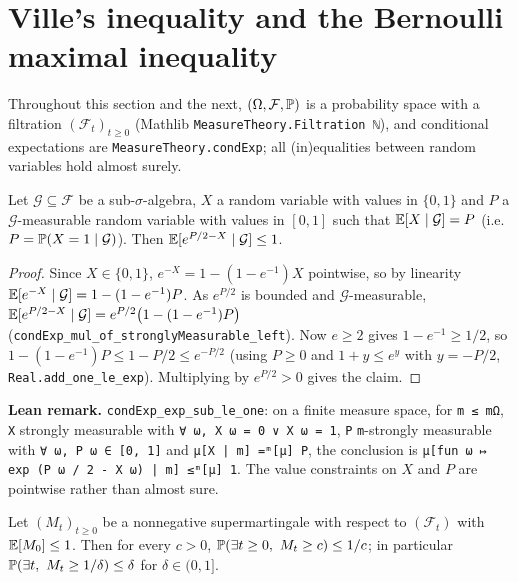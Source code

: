 \section{Ville's inequality and the Bernoulli maximal inequality}
\label{sec:pconc_ville}

Throughout this section and the next, $(\Omega, \mathcal F, \mathbb{P})$ is a probability space
with a filtration $(\mathcal F_t)_{t \ge 0}$ (Mathlib \texttt{MeasureTheory.Filtration ℕ}),
and conditional expectations are \texttt{MeasureTheory.condExp}; all (in)equalities between
random variables hold almost surely.

\begin{lemma}\label{lem:bernoulli_mgf_step}
\leanok
Let $\mathcal G \subseteq \mathcal F$ be a sub-$\sigma$-algebra, $X$ a random variable with
values in $\{0, 1\}$ and $P$ a $\mathcal G$-measurable random variable with values in $[0, 1]$
such that $\mathbb{E}[X \mid \mathcal G] = P$ (i.e.\ $P = \mathbb{P}(X = 1 \mid \mathcal G)$). Then
$\mathbb{E}[e^{P/2 - X} \mid \mathcal G] \le 1$.
\end{lemma}

\begin{proof}
\leanok
Since $X \in \{0, 1\}$, $e^{-X} = 1 - (1 - e^{-1}) X$ pointwise, so by linearity
$\mathbb{E}[e^{-X} \mid \mathcal G] = 1 - (1 - e^{-1}) P$. As $e^{P/2}$ is bounded and
$\mathcal G$-measurable, $\mathbb{E}[e^{P/2 - X} \mid \mathcal G] = e^{P/2}\big(1 - (1 - e^{-1})P\big)$
(\texttt{condExp\_mul\_of\_stronglyMeasurable\_left}). Now $e \ge 2$ gives $1 - e^{-1} \ge 1/2$,
so $1 - (1 - e^{-1})P \le 1 - P/2 \le e^{-P/2}$ (using $P \ge 0$ and $1 + y \le e^y$ with
$y = -P/2$, \texttt{Real.add\_one\_le\_exp}). Multiplying by $e^{P/2} > 0$ gives the claim.
\end{proof}

\textbf{Lean remark.} \texttt{condExp\_exp\_sub\_le\_one}: on a finite measure space, for
\texttt{m ≤ mΩ}, \texttt{X} strongly measurable with \texttt{∀ ω, X ω = 0 ∨ X ω = 1},
\texttt{P} \texttt{m}-strongly measurable with \texttt{∀ ω, P ω ∈ [0, 1]} and
\texttt{μ[X | m] =ᵐ[μ] P}, the conclusion is
\texttt{μ[fun ω ↦ exp (P ω / 2 - X ω) | m] ≤ᵐ[μ] 1}. The value constraints on $X$ and $P$ are
pointwise rather than almost sure.

\begin{lemma}\label{lem:ville}
\leanok
Let $(M_t)_{t \ge 0}$ be a nonnegative supermartingale with respect to $(\mathcal F_t)$ with
$\mathbb{E}[M_0] \le 1$. Then for every $c > 0$, $\mathbb{P}(\exists t \ge 0,\ M_t \ge c) \le 1/c$; in
particular $\Prob(\exists t,\ M_t \ge 1/\delta) \le \delta$ for $\delta \in (0, 1]$.
\end{lemma}

